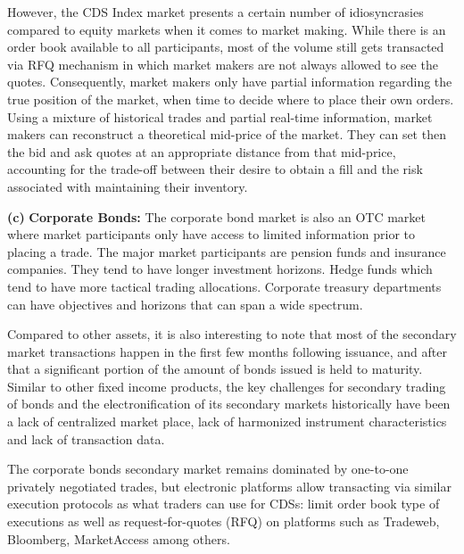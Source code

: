 However, the CDS Index market presents a certain number of idiosyncrasies compared to equity markets when it comes to market making. While there is an order book available to all participants, most of the volume still gets transacted via RFQ mechanism in which market makers are not always allowed to see the quotes. Consequently, market makers only have partial information regarding the true position of the market, when time to decide where to place their own orders. Using a mixture of historical trades and partial real-time information, market makers can reconstruct a theoretical mid-price of the market. They can set then the bid and ask quotes at an appropriate distance from that mid-price, accounting for the trade-off between their desire to obtain a fill and the risk associated with maintaining their inventory. \twomedskip


\noindent\textbf{(c)} \textbf{Corporate Bonds:} The corporate bond market is also an OTC market where market participants only have access to limited information prior to placing a trade. The major market participants are pension funds and insurance companies. They tend to have longer investment horizons. Hedge funds which tend to have more tactical trading allocations. Corporate treasury departments can have objectives and horizons that can span a wide spectrum.


Compared to other assets, it is also interesting to note that most of the secondary market transactions happen in the first few months following issuance, and after that a significant portion of the amount of bonds issued is held to maturity. Similar to other fixed income products, the key challenges for secondary trading of bonds and the electronification of its secondary markets historically have been a lack of centralized market place, lack of harmonized instrument characteristics and lack of transaction data.


The corporate bonds secondary market remains dominated by one-to-one privately negotiated trades, but electronic platforms allow transacting via similar execution protocols as what traders can use for CDSs: limit order book type of executions as well as request-for-quotes (RFQ) on platforms such as Tradeweb, Bloomberg, MarketAccess among others.


